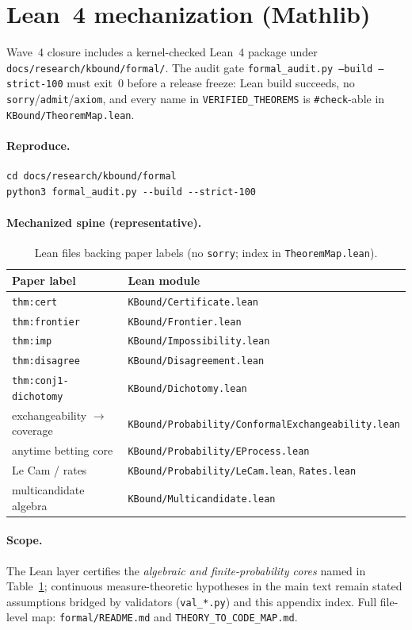 \section{Lean~4 mechanization (Mathlib)}\label{app:lean-formal}

Wave~4 closure includes a kernel-checked Lean~4 package under
\texttt{docs/research/kbound/formal/}. The audit gate
\texttt{formal\_audit.py --build --strict-100} must exit~$0$ before a release freeze:
Lean build succeeds, no \texttt{sorry}/\texttt{admit}/\texttt{axiom}, and every name in
\texttt{VERIFIED\_THEOREMS} is \texttt{\#check}-able in \texttt{KBound/TheoremMap.lean}.

\paragraph{Reproduce.}
\begin{verbatim}
cd docs/research/kbound/formal
python3 formal_audit.py --build --strict-100
\end{verbatim}

\paragraph{Mechanized spine (representative).}
\begin{table}[h]\centering\small
\caption{Lean files backing paper labels (no \texttt{sorry}; index in \texttt{TheoremMap.lean}).}
\label{tab:lean-map}
\begin{tabular}{ll}
\toprule
Paper label & Lean module \\
\midrule
\texttt{thm:cert} & \texttt{KBound/Certificate.lean} \\
\texttt{thm:frontier} & \texttt{KBound/Frontier.lean} \\
\texttt{thm:imp} & \texttt{KBound/Impossibility.lean} \\
\texttt{thm:disagree} & \texttt{KBound/Disagreement.lean} \\
\texttt{thm:conj1-dichotomy} & \texttt{KBound/Dichotomy.lean} \\
exchangeability $\to$ coverage & \texttt{KBound/Probability/ConformalExchangeability.lean} \\
anytime betting core & \texttt{KBound/Probability/EProcess.lean} \\
Le Cam / rates & \texttt{KBound/Probability/LeCam.lean}, \texttt{Rates.lean} \\
multicandidate algebra & \texttt{KBound/Multicandidate.lean} \\
\bottomrule
\end{tabular}
\end{table}

\paragraph{Scope.}
The Lean layer certifies the \emph{algebraic and finite-probability cores} named in
Table~\ref{tab:lean-map}; continuous measure-theoretic hypotheses in the main text remain
stated assumptions bridged by validators (\texttt{val\_*.py}) and this appendix index.
Full file-level map: \texttt{formal/README.md} and \texttt{THEORY\_TO\_CODE\_MAP.md}.
